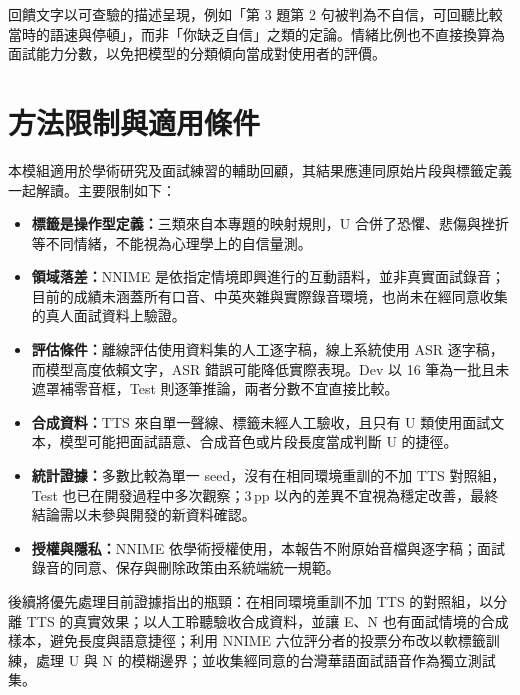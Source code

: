 回饋文字以可查驗的描述呈現，例如「第 3 題第 2 句被判為不自信，可回聽比較當時的語速與停頓」，而非「你缺乏自信」之類的定論。情緒比例也不直接換算為面試能力分數，以免把模型的分類傾向當成對使用者的評價。


\section{方法限制與適用條件}
\label{sec:limits}

本模組適用於學術研究及面試練習的輔助回顧，其結果應連同原始片段與標籤定義一起解讀。主要限制如下：

\begin{itemize}
  \item \textbf{標籤是操作型定義：}三類來自本專題的映射規則，U 合併了恐懼、悲傷與挫折等不同情緒，不能視為心理學上的自信量測。
  \item \textbf{領域落差：}NNIME 是依指定情境即興進行的互動語料，並非真實面試錄音；目前的成績未涵蓋所有口音、中英夾雜與實際錄音環境，也尚未在經同意收集的真人面試資料上驗證。
  \item \textbf{評估條件：}離線評估使用資料集的人工逐字稿，線上系統使用 ASR 逐字稿，而模型高度依賴文字，ASR 錯誤可能降低實際表現。Dev 以 16 筆為一批且未遮罩補零音框，Test 則逐筆推論，兩者分數不宜直接比較。
  \item \textbf{合成資料：}TTS 來自單一聲線、標籤未經人工驗收，且只有 U 類使用面試文本，模型可能把面試語意、合成音色或片段長度當成判斷 U 的捷徑。
  \item \textbf{統計證據：}多數比較為單一 seed，沒有在相同環境重訓的不加 TTS 對照組，Test 也已在開發過程中多次觀察；3\,pp 以內的差異不宜視為穩定改善，最終結論需以未參與開發的新資料確認。
  \item \textbf{授權與隱私：}NNIME 依學術授權使用，本報告不附原始音檔與逐字稿；面試錄音的同意、保存與刪除政策由系統端統一規範。
\end{itemize}

後續將優先處理目前證據指出的瓶頸：在相同環境重訓不加 TTS 的對照組，以分離 TTS 的真實效果；以人工聆聽驗收合成資料，並讓 E、N 也有面試情境的合成樣本，避免長度與語意捷徑；利用 NNIME 六位評分者的投票分布改以軟標籤訓練，處理 U 與 N 的模糊邊界；並收集經同意的台灣華語面試語音作為獨立測試集。

